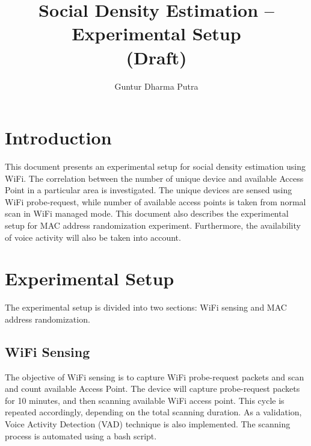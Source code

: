 \documentclass{article}
\begin{document}
\title{Social Density Estimation -- Experimental Setup\\(Draft)}
\author{Guntur Dharma Putra}

\maketitle



\section{Introduction} %
\label{sec:introduction}
This document presents an experimental setup for social density estimation using WiFi. The correlation between the number of unique device and available Access Point in a particular area is investigated. The unique devices are sensed using WiFi probe-request, while number of available access points is taken from normal scan in WiFi managed mode. This document also describes the experimental setup for MAC address randomization experiment. Furthermore, the availability of voice activity will also be taken into account.

\section{Experimental Setup} %
\label{sec:experimental_setup}
The experimental setup is divided into two sections: WiFi sensing and MAC address randomization.

\subsection{WiFi Sensing} %
\label{sub:wifi_sensing}
The objective of WiFi sensing is to capture WiFi probe-request packets and scan and count available Access Point. The device will capture probe-request packets for 10 minutes, and then scanning available WiFi access point. This cycle is repeated accordingly, depending on the total scanning duration. As a validation, Voice Activity Detection (VAD) technique is also implemented. The scanning process is automated using a bash script.
\end{document}
